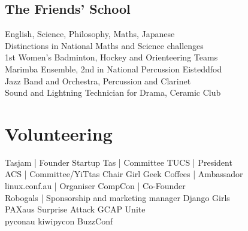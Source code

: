 \documentclass[a4paper]{deedy-resume} %
\begin{document}
\begin{minipage}[t]{0.33\textwidth}
\subsection{The Friends' School}

English, Science, Philosophy, Maths, Japanese \\
Distinctions in National Maths and Science challenges \\
1st Women's Badminton, Hockey and Orienteering Teams \\
Marimba Ensemble, 2nd in National Percussion Eisteddfod \\
Jazz Band and Orchestra, Percussion and Clarinet \\
Sound and Lightning Technician for Drama, Ceramic Club \\

\sectionspace %


\section{Volunteering}

Tasjam | Founder \textbullet{} Startup Tas | Committee \textbullet{} TUCS | President \textbullet{} \\
ACS | Committee/YiTtas Chair \textbullet{} Girl Geek Coffees | Ambassador \\
linux.conf.au | Organiser \textbullet{} CompCon | Co-Founder \\
Robogals | Sponsorship and marketing manager \textbullet{} Django Girls \\
PAXaus \textbullet{} Surprise Attack \textbullet{} GCAP \textbullet{} Unite \\
pyconau \textbullet{} kiwipycon \textbullet{} BuzzConf  \\





\end{minipage}
\end{document}
